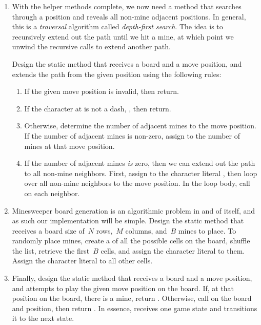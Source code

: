 \begin{enumerate}[label=(\alph*)]
    \item With the helper methods complete, we now need a method that searches through a position and reveals all non-mine adjacent positions. In general, this is a \emph{traversal} algorithm called \emph{depth-first search}. The idea is to recursively extend out the path until we hit a mine, at which point we unwind the recursive calls to extend another path.

    Design the static  method that receives a board and a move position, and extends the path from the given position using the following rules:

    \begin{enumerate}[label=(\roman*)]
        \item If the given move position is invalid, then return.
        \item If the character at  is not a dash, \ttt{\q{}-\q{}}, then return.
        \item Otherwise, determine the number of adjacent mines to the move position. If the number of adjacent mines is non-zero, assign to  the number of mines at that move position.
        \item If the number of adjacent mines \emph{is} zero, then we can extend out the path to all non-mine neighbors. First, assign to  the character literal , then loop over all non-mine neighbors to the move position. In the loop body, call  on each neighbor.
    \end{enumerate}

    \item Minesweeper board generation is an algorithmic problem in and of itself, and as such our implementation will be simple.
    Design the static  method that receives a board size of~$N$ rows,~$M$ columns, and~$B$ mines to place.
    To randomly place mines, create a  of all the possible cells on the board, shuffle the list, retrieve the first~$B$ cells, and assign the character literal  to them. Assign the character literal \ttt{\q{}-\q{}} to all other cells.

    \item Finally, design the static  method that receives a board and a move position, and attempts to play the given move position on the board. If, at that position on the board, there is a mine, return . Otherwise, call  on the board and position, then return . In essence,  receives one game state and transitions it to the next state.
\end{enumerate}

